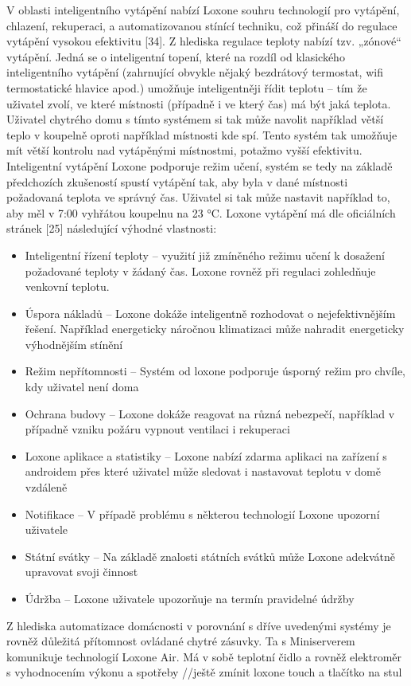 V oblasti inteligentního vytápění nabízí Loxone souhru technologií pro vytápění, chlazení, rekuperaci, a automatizovanou stínící techniku, což přináší do regulace vytápění vysokou efektivitu [34]. \newline
Z hlediska regulace teploty nabízí tzv. „zónové“ vytápění. Jedná se o inteligentní topení, které na rozdíl od klasického inteligentního vytápění (zahrnující obvykle nějaký bezdrátový termostat, wifi termostatické hlavice apod.) umožňuje inteligentněji řídit teplotu – tím že uživatel zvolí, ve které místnosti (případně i ve který čas) má být jaká teplota. Uživatel chytrého domu s tímto systémem si tak může navolit například větší teplo v koupelně oproti například místnosti kde spí. Tento systém tak umožňuje mít větší kontrolu nad vytápěnými místnostmi, potažmo vyšší efektivitu. \newline
Inteligentní vytápění Loxone podporuje režim učení, systém se tedy na základě předchozích zkušeností spustí vytápění tak, aby byla v dané místnosti požadovaná teplota ve správný čas. Uživatel si tak může nastavit například to, aby měl v 7:00 vyhřátou koupelnu na 23 °C. \newline
Loxone vytápění má dle oficiálních stránek [25] následující výhodné vlastnosti:
\begin{itemize}
    \item Inteligentní řízení teploty – využití již zmíněného režimu učení k dosažení požadované teploty v žádaný čas. Loxone rovněž při regulaci zohledňuje venkovní teplotu.
    \item Úspora nákladů – Loxone dokáže inteligentně rozhodovat o nejefektivnějším řešení. Například energeticky náročnou klimatizaci může nahradit energeticky výhodnějším stínění
    \item Režim nepřítomnosti – Systém od loxone podporuje úsporný režim pro chvíle, kdy uživatel není doma
    \item Ochrana budovy – Loxone dokáže reagovat na různá nebezpečí, například v případně vzniku požáru vypnout ventilaci i rekuperaci
    \item Loxone aplikace a statistiky – Loxone nabízí zdarma aplikaci na zařízení s androidem přes které uživatel může sledovat i nastavovat teplotu v domě vzdáleně
    \item Notifikace – V případě problému s některou technologií Loxone upozorní uživatele
    \item Státní svátky – Na základě znalosti státních svátků může Loxone adekvátně upravovat svoji činnost
    \item Údržba – Loxone uživatele upozorňuje na termín pravidelné údržby
\end{itemize}
Z hlediska automatizace domácnosti v porovnání s dříve uvedenými systémy je rovněž důležitá přítomnost ovládané chytré zásuvky. Ta s Miniserverem komunikuje technologií Loxone Air. Má v sobě teplotní čidlo a rovněž elektroměr s vyhodnocením výkonu a spotřeby \newline
//ještě zmínit loxone touch a tlačítko na stul \newline

